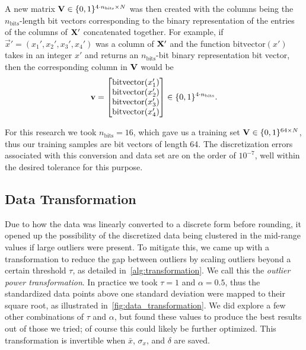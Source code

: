 A new matrix \( \mathbf{V} \in \{0,1\}^{4\cdot n_\text{bits} \times N} \) was then created with the columns being the \( n_\text{bits} \)-length bit vectors corresponding to the binary representation of the entries of the columns of \( \mathbf{X}' \) concatenated together.
For example, if \( \vec{x}' = (x_1',x_2',x_3',x_4') \) was a column of \( \mathbf{X}' \) and the function \( \text{bitvector}(x') \) takes in an integer \( x' \) and returns an \( n_\text{bits} \)-bit binary representation bit vector, then the corresponding column in \( \mathbf{V} \) would be
\begin{align}
    \mathbf{v} = \begin{bmatrix}
        \text{bitvector}(x_1') \\
        \text{bitvector}(x_2') \\
        \text{bitvector}(x_3') \\
        \text{bitvector}(x_4') \\
    \end{bmatrix}
    \in \{0,1\}^{4\cdot n_\text{bits}}.
\end{align}

For this research we took \( n_\text{bits} = 16 \), which gave us a training set \( \mathbf{V} \in \{0,1\}^{64 \times N} \), thus our training samples are bit vectors of length 64.
The discretization errors associated with this conversion and data set are on the order of \( 10^{-7} \), well within the desired tolerance for this purpose.

\subsection{Data Transformation}\label{sec:outlier_transform}
Due to how the data was linearly converted to a discrete form before rounding, it opened up the possibility of the discretized data being clustered in the mid-range values if large outliers were present.
To mitigate this, we came up with a transformation to reduce the gap between outliers by scaling outliers beyond a certain threshold \( \tau \), as detailed in~\cref{alg:transformation}.
We call this the \textit{outlier power transformation}.
In practice we took \( \tau = 1 \) and \( \alpha = 0.5 \), thus the standardized data points above one standard deviation were mapped to their square root, as illustrated in~\cref{fig:data_transformation}.
We did explore a few other combinations of \( \tau \) and \( \alpha \), but found these values to produce the best results out of those we tried; of course this could likely be further optimized.
This transformation is invertible when \( \bar{x} \), \( \sigma_x \), and \( \delta \) are saved.

